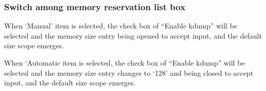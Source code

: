\documentclass{article}
\begin{document}
\subsubsection{Switch among memory reservation list box}
\noindent
When `Manual' item is selected, the check box of ``Enable kdump'' will be
selected and the memory size entry being opened to accept input, and the
default size scope emerges.\\
\begin{figure}[H]        
\end{figure}
\noindent
When `Automatic item is selected, the check box of ``Enable kdump'' will be
selected and the memory size entry changes to `128' and being closed to accept
input, and the default size scope emerges.\\
\begin{figure}[H]        
\end{figure}
\end{document}
